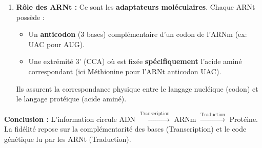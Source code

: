 \documentclass[11pt]{article}
\begin{document}
\begin{exoresolu}
\begin{enumerate}
            \begin{align*}
                \text{Codon 1 : } & \textbf{AUG} \rightarrow \textbf{Méthionine (Met)} \text{ (Start)} \\
                \text{Codon 2 : } & \textbf{GCU} \rightarrow \textbf{Alanine (Ala)} \\
                \text{Codon 3 : } & \textbf{UUA} \rightarrow \textbf{Leucine (Leu)} \quad (\text{Présent dans le tableau : UUA = Leu}) \\
                \text{Codon 4 : } & \textbf{CGA} \rightarrow \textbf{Arginine (Arg)}
            \end{align*}
            \textit{Attention : La séquence donnée ne contient pas de codon STOP. La traduction s'arrêterait au codon STOP suivant dans la séquence réelle.}
            \textbf{Séquence peptidique :} \textbf{Met - Ala - Leu - Arg - ...}
        \item \textbf{Rôle des ARNt :} Ce sont les \textbf{adaptateurs moléculaires}. Chaque ARNt possède :
            \begin{itemize}
                \item Un \textbf{anticodon} (3 bases) complémentaire d'un codon de l'ARNm (ex: UAC pour AUG).
                \item Une extrémité 3' (CCA) où est fixée \textbf{spécifiquement} l'acide aminé correspondant (ici Méthionine pour l'ARNt anticodon UAC).
            \end{itemize}
            Ils assurent la correspondance physique entre le langage nucléique (codon) et le langage protéique (acide aminé).
    \end{enumerate}
    \textbf{Conclusion :} L'information circule ADN $\xrightarrow{\text{Transcription}}$ ARNm $\xrightarrow{\text{Traduction}}$ Protéine. La fidélité repose sur la complémentarité des bases (Transcription) et le code génétique lu par les ARNt (Traduction).
\end{exoresolu}
\end{document}

